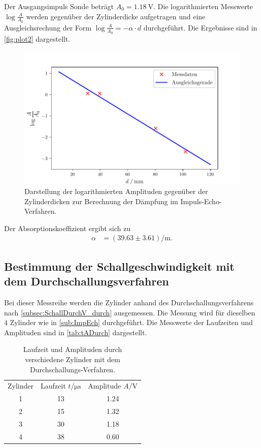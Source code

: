 Der Ausgangsimpuls Sonde beträgt $A_0= \qty{1.18}{\volt}$.
Die logarithmierten Messwerte $\log{\frac{A}{A_0}}$ werden gegenüber der Zylinderdicke aufgetragen und eine 
Ausgleichsrechung der Form $\log{\frac{A}{A_0}}= -\alpha \cdot d$ durchgeführt. Die Ergebnisse sind in \autoref{fig:plot2} dargestellt.
\begin{figure}[H]
  \centering
  \includegraphics{build/plot2.pdf}
  \caption {Darstellung der logarithmierten Amplituden gegenüber der Zylinderdicken zur Berechnung der Dämpfung im Impuls-Echo-Verfahren.}
  \label{fig:plot2}
\end{figure}

Der Absorptionskoeffizient ergibt sich zu
\begin{align*}
  \alpha &=( 39.63\pm 3.61) \si{\per\meter}.
\end{align*}

\subsection{Bestimmung der Schallgeschwindigkeit mit dem Durchschallungsverfahren}
\label{subsec:SchallDurchV}

Bei dieser Messreihe werden die Zylinder anhand des Durchschallungsverfahrens nach \autoref{subsec:SchallDurchV_durch} ausgemessen.
Die Messung wird für dieselben $4$ Zylinder wie in \autoref{sub:ImpEch} durchgeführt.
Die Messwerte der Laufzeiten und Amplituden sind in \autoref{tab:tADurch} dargestellt.

\begin{table}[H]
  \centering
  \caption{Laufzeit und Amplituden durch verschiedene Zylinder mit dem Durchschallungs-Verfahren.}
  \label{tab:tADurch}
  \begin{tabular}{S[table-format=1.0] S[table-format=2.0] S[table-format=1.2] }
  \toprule
  {Zylinder} & {Laufzeit $t / \si{\micro\second}$} &  {Amplitude $A / \si{\volt}$}\\
  1 &  13  & 1.24  \\
  2 &  15  & 1.32  \\
  3 &  30  & 1.18  \\
  4 &  38  & 0.60  \\
  \bottomrule
  \end{tabular}
\end{table}

